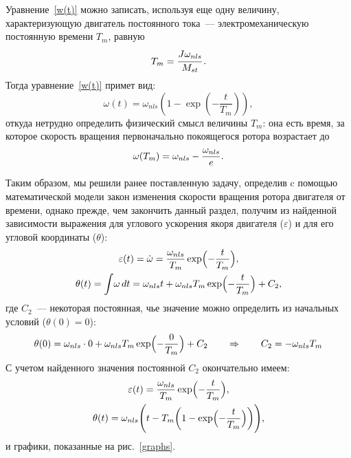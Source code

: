 \documentclass[12pt,a4paper,openany]{extarticle}
\begin{document}
Уравнение~\eqref{w(t)} можно записать, используя еще одну величину, характеризующую двигатель постоянного тока~--- электромеханическую постоянную времени $T_m$, равную
\begin{equation}\label{T_m}
	T_m = \cfrac{J\omega_{nls}}{M_{st}}\,\ldotp
\end{equation}
Тогда уравнение~\eqref{w(t)} примет вид:
\begin{equation}
	\omega(t) = \omega_{nls}\left(1 - \exp\left(-\frac{t}{T_m}\right)\right),
\end{equation} 
откуда нетрудно определить физический смысл величины $T_m$: она есть время, за которое скорость вращения первоначально покоящегося ротора возрастает до 
\begin{equation}
	\omega(T_m) = \omega_{nls} - \frac{\omega_{nls}}{e}\ldotp
\end{equation}


Таким образом, мы решили ранее поставленную задачу, определив c помощью математической модели закон изменения скорости вращения ротора двигателя от времени, однако прежде, чем закончить данный раздел, получим из найденной зависимости выражения для углового ускорения якоря двигателя ($\varepsilon$) и для его угловой координаты ($\theta$):
\begin{gather}
	\varepsilon(t) = \dot\omega = \frac{\omega_{nls}}{T_m}\exp\Bigl(-\frac{t}{T_m}\Bigr),\\
	\theta(t) = \int\!\omega\,dt = \omega_{nls}t + \omega_{nls}T_m\exp\Bigl(-\frac{t}{T_m}\Bigr) + C_2,
\end{gather}
где $C_2$~--- некоторая постоянная, чье значение можно определить из начальных условий ($\theta(0) = 0$):
\begin{equation}
	\theta(0) = \omega_{nls}\cdot0 + \omega_{nls}T_m\exp\Bigl(-\frac0{T_m}\Bigr) + C_2 \qquad \Rightarrow \qquad C_2 = -\omega_{nls}T_m
\end{equation}
С учетом найденного значения постоянной $C_2$ окончательно имеем:
\begin{gather}
	\varepsilon(t) = \frac{\omega_{nls}}{T_m}\exp\Bigl(-\frac{t}{T_m}\Bigr),\\
	\theta(t) = \omega_{nls}\Biggl(t - T_m\biggl(1 - \exp\Bigl(-\frac{t}{T_m}\Bigr)\biggr)\Biggr),\label{theta(t)}
\end{gather}
и графики, показанные на рис.~\ref{graphs}.
\end{document}

